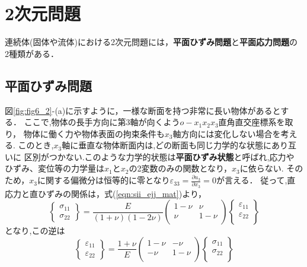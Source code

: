 \documentclass[10pt,a4j]{jbook}
\begin{document}
\section{2次元問題}
連続体(固体や流体)における2次元問題には，{\bf 平面ひずみ問題}と{\bf 平面応力問題}の
2種類がある．
\subsection{平面ひずみ問題}
図\ref{fig:fig6_2}-(a)に示すように，一様な断面を持つ非常に長い物体があるとする．
ここで,物体の長手方向に第3軸が向くよう$o-x_1x_2x_3$直角直交座標系を取り，
物体に働く力や物体表面の拘束条件も$x_3$軸方向には変化しない場合を考える.
このとき,$x_3$軸に垂直な物体断面内は,どの断面も同じ力学的な状態にあり互いに
区別がつかない.このような力学的状態は{\bf 平面ひずみ状態}と呼ばれ,応力や
ひずみ、変位等の力学量は$x_1$と$x_2$の2変数のみの関数となり，$x_3$に依らない.
そのため，$x_3$に関する偏微分は恒等的に零となり$\varepsilon_{33}=
\frac{\partial u_3}{\partial x_3}=0$が言える．
従って,直応力と直ひずみの関係は，式(\ref{eqn:sii_ejj_mat})より，
\begin{equation}
	\left\{ 
	\begin{array}{*{20}{c}}
		\sigma _{11}\\
		\sigma _{22}
	\end{array} 
	\right\} 
	= 
	\frac{E}{\left( 1 + \nu  \right)\left( 1 - 2\nu  \right)}
	\left( 
		\begin{array}{*{20}{c}}
		1 - \nu & \nu \\
		\nu & 1 - \nu \\
		\end{array}
	\right)
	\left\{ 
		\begin{array}{*{20}{c}}
		\varepsilon _{11}\\
		\varepsilon _{22}\\
		\end{array}
	\right\}
	\label{eqn:Hooke_pstrain}
\end{equation}
となり,この逆は
\begin{equation}
	\left\{ 
	\begin{array}{*{20}{c}}
		\varepsilon _{11}\\
		\varepsilon_{22}
	\end{array} 
	\right\} 
	= 
	\frac{1+\nu}{E}
	\left( 
		\begin{array}{*{20}{c}}
		1 - \nu & -\nu \\
		-\nu & 1 - \nu \\
		\end{array}
	\right)
	\left\{ 
		\begin{array}{*{20}{c}}
		\sigma_{11}\\
		\sigma_{22}\\
		\end{array}
	\right\}
	\label{eqn:Hooke_pstrain}
\end{equation}
\end{document}
